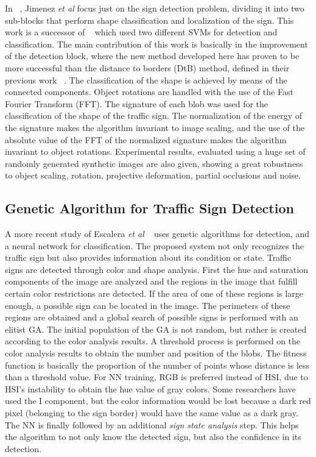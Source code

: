 \documentclass[review,number]{elsarticle}
\begin{document}
In ~\cite{signbib09}, Jimenez \textit{et al} focus just on the sign detection problem, dividing it into two sub-blocks that perform shape classification and localization of the sign. This work is a successor of ~\cite{Maldonadobascon07} which used two different SVMs for detection and classification. The main contribution of this work is basically in the improvement of the detection block, where the new method developed here has proven to be more successful than the distance to borders (DtB) method, defined in their previous work ~\cite{Maldonadobascon07}. The classification of the shape is achieved by means of the connected components. Object rotations are handled with the use of the Fast Fourier Transform (FFT). The signature of each blob was used for the classification of the shape of the traffic sign. The normalization of the energy of the signature makes the algorithm invariant to image scaling, and the use of the absolute value of the FFT of the normalized signature makes the algorithm invariant to object rotations. Experimental results, evaluated using a huge set of randomly generated synthetic images are also given, showing a great robustness to object scaling, rotation, projective deformation, partial occlusions and noise.

\subsection{Genetic Algorithm for Traffic Sign Detection}
A more recent study of Escalera \textit{et al} ~\cite{signbib10} uses genetic algorithms for detection, and a neural network for classification. The proposed system not only recognizes the traffic sign but also provides information about its condition or state. Traffic signs are detected through color and shape analysis. First the hue and saturation components of the image are analyzed and the regions in the image that fulfill certain color restrictions are detected. If the area of one of these regions is large enough, a possible sign can be located in the image. The perimeters of these regions are obtained and a global search of possible signs is performed with an elitist GA. The initial population of the GA is not random, but rather is created according to the color analysis results. A threshold process is performed on the color analysis results to obtain the number and position of the blobs. The fitness function is basically the proportion of the number of points whose distance is less than a threshold value. For NN training, RGB is preferred instead of HSI, due to HSI's instability to obtain the hue value of gray colors. Some researchers have used the I component, but the color information would be lost because a dark red pixel (belonging to the sign border) would have the same value as a dark gray. The NN is finally followed by an additional \textit{sign state analysis} step. This helps the algorithm to not only know the detected sign, but also the confidence in its detection.
\end{document}
